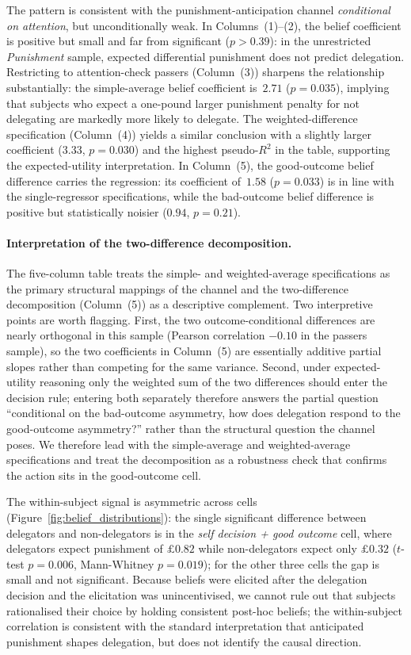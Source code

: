 The pattern is consistent with the punishment-anticipation channel \textit{conditional on attention}, but unconditionally weak. In Columns~(1)--(2), the belief coefficient is positive but small and far from significant ($p>0.39$): in the unrestricted \textit{Punishment} sample, expected differential punishment does not predict delegation. Restricting to attention-check passers (Column~(3)) sharpens the relationship substantially: the simple-average belief coefficient is~$2.71$ ($p=0.035$), implying that subjects who expect a one-pound larger punishment penalty for not delegating are markedly more likely to delegate. The weighted-difference specification (Column~(4)) yields a similar conclusion with a slightly larger coefficient ($3.33$, $p=0.030$) and the highest pseudo-$R^2$ in the table, supporting the expected-utility interpretation. In Column~(5), the good-outcome belief difference carries the regression: its coefficient of~$1.58$ ($p=0.033$) is in line with the single-regressor specifications, while the bad-outcome belief difference is positive but statistically noisier ($0.94$, $p=0.21$).



\paragraph*{Interpretation of the two-difference decomposition.}
The five-column table treats the simple- and weighted-average specifications as the primary structural mappings of the channel and the two-difference decomposition (Column~(5)) as a descriptive complement. Two interpretive points are worth flagging. First, the two outcome-conditional differences are nearly orthogonal in this sample (Pearson correlation $-0.10$ in the passers sample), so the two coefficients in Column~(5) are essentially additive partial slopes rather than competing for the same variance. Second, under expected-utility reasoning only the weighted sum of the two differences should enter the decision rule; entering both separately therefore answers the partial question ``conditional on the bad-outcome asymmetry, how does delegation respond to the good-outcome asymmetry?'' rather than the structural question the channel poses. We therefore lead with the simple-average and weighted-average specifications and treat the decomposition as a robustness check that confirms the action sits in the good-outcome cell.

The within-subject signal is asymmetric across cells (Figure~\ref{fig:belief_distributions}): the single significant difference between delegators and non-delegators is in the \textit{self decision + good outcome} cell, where delegators expect punishment of $\pounds 0.82$ while non-delegators expect only $\pounds 0.32$ ($t$-test $p=0.006$, Mann-Whitney $p=0.019$); for the other three cells the gap is small and not significant. Because beliefs were elicited after the delegation decision and the elicitation was unincentivised, we cannot rule out that subjects rationalised their choice by holding consistent post-hoc beliefs; the within-subject correlation is consistent with the standard interpretation that anticipated punishment shapes delegation, but does not identify the causal direction.

